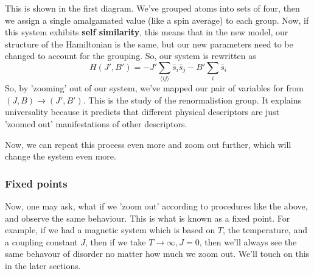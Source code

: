 This is shown in the first diagram. We've grouped atoms into sets of four, then we assign a single amalgamated value (like a spin average) to each group. Now, if this system exhibits \textbf{self similarity}, this means that in the new model, our structure of the Hamiltonian is the same, but our new parameters need to be changed to account for the grouping. So, our system is rewritten as \[ 
	H(J', B') = - J' \sum_{ \langle ij \rangle } \bar{s}_i \bar{s}_j  -  B' \sum_i \bar{ s}_i \]
So, by 'zooming' out of our system, we've mapped our pair of variables for from $(J, B) \rightarrow (J', B') $. This is the study of the renormalistion group. It explains universality because it predicts that different physical descriptors are just 'zoomed out' manifestations of other descriptors.  

Now, we can repeat this process even more and zoom out further, which will change the system even more. 
\subsubsection{Fixed points} 
Now, one may ask, what if we 'zoom out' according to procedures like the above, and observe the same behaviour. This is what is known as a fixed point. For example, if we had a magnetic system which is based on $T$, the temperature, and a coupling constant $J$, then if we take $T \rightarrow \infty, J = 0$, then we'll always see the same behavour of disorder no matter how much we zoom out. We'll touch on this in the later sections.

 
